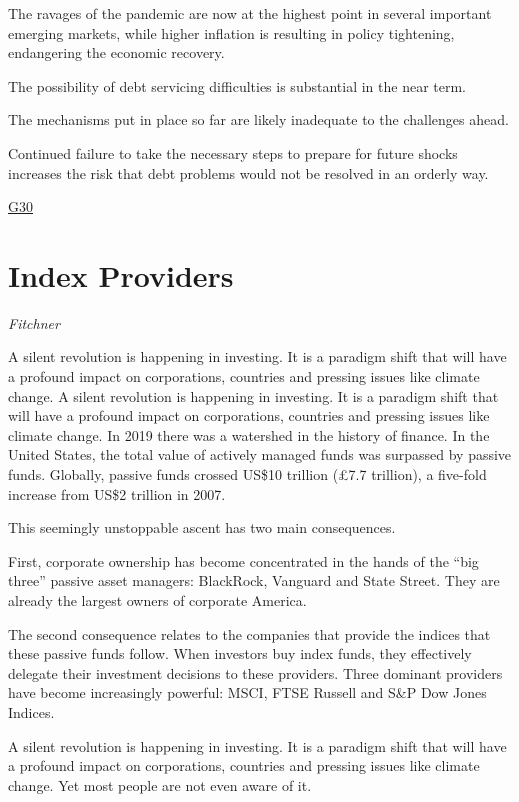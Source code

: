 \documentclass[
]{book}
\begin{document}
The ravages of the pandemic are now at the highest point in several important emerging markets, while higher inflation is resulting in policy tightening, endangering the economic recovery.

The possibility of debt servicing difficulties is substantial in the near term.

The mechanisms put in place so far are likely inadequate to the challenges ahead.

Continued failure to take the necessary steps to prepare for future shocks increases the risk that debt problems would not be resolved in an orderly way.

\href{https://group30.org/publications/detail/4915}{G30}

\hypertarget{index-providers-1}{%
\chapter{Index Providers}\label{index-providers-1}}

\emph{Fitchner}

A silent revolution is happening in investing. It is a paradigm shift that will have a profound impact on corporations, countries and pressing issues like climate change.
A silent revolution is happening in investing. It is a paradigm shift that will have a profound impact on corporations, countries and pressing issues like climate change.
In 2019 there was a watershed in the history of finance. In the United States, the total value of actively managed funds was surpassed by passive funds. Globally, passive funds crossed US\$10 trillion (£7.7 trillion), a five-fold increase from US\$2 trillion in 2007.

This seemingly unstoppable ascent has two main consequences.

First, corporate ownership has become concentrated in the hands of the ``big three'' passive asset managers: BlackRock, Vanguard and State Street. They are already the largest owners of corporate America.

The second consequence relates to the companies that provide the indices that these passive funds follow. When investors buy index funds, they effectively delegate their investment decisions to these providers. Three dominant providers have become increasingly powerful: MSCI, FTSE Russell and S\&P Dow Jones Indices.

A silent revolution is happening in investing. It is a paradigm shift that will have a profound impact on corporations, countries and pressing issues like climate change. Yet most people are not even aware of it.
\end{document}
